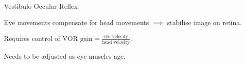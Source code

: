 \documentclass{beamer}%
\begin{document}
%
%
%

\begin{frame}{Vestibulo-Occular Reflex}
%
 \parbox[t]{0.35\linewidth}{}
 \parbox[t]{0.64\linewidth}{%
 Eye movements compensate for head movements $\implies$ stabilise image on retina.

 \vp Requires control of $\text{VOR gain} = \frac{\text{eye velocity}}{\text{head velocity}}$.

 \vp Needs to be adjusted as eye muscles age, \etc
 }

%
\end{frame}


\end{document}
